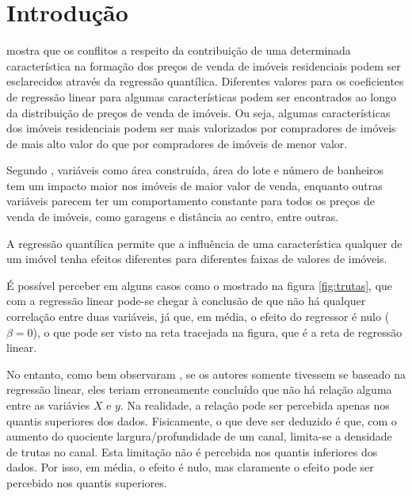 \documentclass[a4paper, 12pt]{article}
\begin{document}
\hypertarget{introducao}{%
\section{Introdução}\label{introducao}}

\textcite{Zietz} mostra que os conflitos a respeito da contribuição de
uma determinada característica na formação dos preços de venda de
imóveis residenciais podem ser esclarecidos através da regressão
quantílica. Diferentes valores para os coeficientes de regressão linear
para algumas características podem ser encontrados ao longo da
distribuição de preços de venda de imóveis. Ou seja, algumas
características dos imóveis residenciais podem ser mais valorizados por
compradores de imóveis de mais alto valor do que por compradores de
imóveis de menor valor.

Segundo \textcite{Zietz}, variáveis como área construída, área do lote e
número de banheiros tem um impacto maior nos imóveis de maior valor de
venda, enquanto outras variáveis parecem ter um comportamento constante
para todos os preços de venda de imóveis, como garagens e distância ao
centro, entre outras.

A regressão quantílica permite que a influência de uma característica
qualquer de um imóvel tenha efeitos diferentes para diferentes faixas de
valores de imóveis.

É possível perceber em alguns casos como o mostrado na figura
\ref{fig:trutas}, que com a regressão linear pode-se chegar à conclusão
de que não há qualquer correlação entre duas variáveis, já que, em
média, o efeito do regressor é nulo (\(\beta = 0\)), o que pode ser
visto na reta tracejada na figura, que é a reta de regressão linear.

No entanto, como bem observaram \textcite[412-413]{QReco}, se os autores
somente tivessem se baseado na regressão linear, eles teriam
erroneamente concluído que não há relação alguma entre as variávies
\(X\) e \(y\). Na realidade, a relação pode ser percebida apenas nos
quantis superiores dos dados. Fisicamente, o que deve ser deduzido é
que, com o aumento do quociente largura/profundidade de um canal,
limita-se a densidade de trutas no canal. Esta limitação não é percebida
nos quantis inferiores dos dados. Por isso, em média, o efeito é nulo,
mas claramente o efeito pode ser percebido nos quantis superiores.
\end{document}
